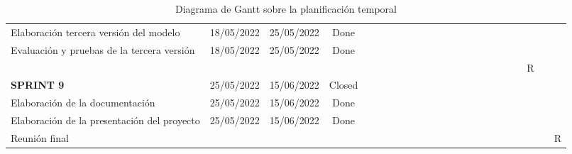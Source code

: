 \begin{landscape}
\begin{table}[h]
{\begin{tabular}{|lccc|l|l|l|l|l|l|l|l|l|l|l|l|l|l|l|l|l|l|l|}
   &
   &
   &
   &
   &
   &
   &
   &
   &
   &
   &
  \cellcolor[HTML]{07BB30} &
   &
   &
   &
   \\ \hline
\multicolumn{1}{|l|}{Elaboración tercera versión del modelo} &
  \multicolumn{1}{c|}{18/05/2022} &
  \multicolumn{1}{c|}{25/05/2022} &
  Done &
   &
   &
   &
   &
   &
   &
   &
   &
   &
   &
   &
   &
   &
   &
  \cellcolor[HTML]{07BB30} &
   &
   &
   &
   \\ \hline
\multicolumn{1}{|l|}{Evaluación y pruebas de la tercera versión} &
  \multicolumn{1}{c|}{18/05/2022} &
  \multicolumn{1}{c|}{25/05/2022} &
  Done &
   &
   &
   &
   &
   &
   &
   &
   &
   &
   &
   &
   &
   &
   &
  \cellcolor[HTML]{07BB30} &
   &
   &
   &
   \\ \hline
\multicolumn{4}{|l|}{} &
   &
   &
   &
   &
   &
   &
   &
   &
   &
   &
   &
   &
   &
   &
   &
   &
  \multicolumn{1}{c|}{\cellcolor[HTML]{FFFFC7}R} &
   &
   \\ \hline
\multicolumn{1}{|l|}{\cellcolor[HTML]{C0C0C0}\textbf{SPRINT 9}} &
  \multicolumn{1}{c|}{\cellcolor[HTML]{C0C0C0}25/05/2022} &
  \multicolumn{1}{c|}{\cellcolor[HTML]{C0C0C0}15/06/2022} &
  \cellcolor[HTML]{C0C0C0}Closed &
   &
   &
   &
   &
   &
   &
   &
   &
   &
   &
   &
   &
   &
   &
   &
  \cellcolor[HTML]{A1E8A8} &
  \cellcolor[HTML]{A1E8A8} &
  \cellcolor[HTML]{A1E8A8} &
   \\ \hline
\multicolumn{1}{|l|}{Elaboración de la documentación} &
  \multicolumn{1}{c|}{25/05/2022} &
  \multicolumn{1}{c|}{15/06/2022} &
  Done &
  \cellcolor[HTML]{A1E8A8} &
  \cellcolor[HTML]{A1E8A8} &
  \cellcolor[HTML]{A1E8A8} &
  \cellcolor[HTML]{A1E8A8} &
  \cellcolor[HTML]{A1E8A8} &
  \cellcolor[HTML]{A1E8A8} &
  \cellcolor[HTML]{A1E8A8} &
  \cellcolor[HTML]{A1E8A8} &
  \cellcolor[HTML]{A1E8A8} &
  \cellcolor[HTML]{A1E8A8} &
  \cellcolor[HTML]{A1E8A8} &
  \cellcolor[HTML]{A1E8A8} &
  \cellcolor[HTML]{A1E8A8} &
  \cellcolor[HTML]{A1E8A8} &
  \cellcolor[HTML]{A1E8A8} &
  \cellcolor[HTML]{07BB30} &
  \cellcolor[HTML]{07BB30} &
  \cellcolor[HTML]{07BB30} &
   \\ \hline
\multicolumn{1}{|l|}{Elaboración de la presentación del proyecto} &
  \multicolumn{1}{c|}{25/05/2022} &
  \multicolumn{1}{c|}{15/06/2022} &
  Done &
   &
   &
   &
   &
   &
   &
   &
   &
   &
   &
   &
   &
   &
   &
   &
  \cellcolor[HTML]{07BB30} &
  \cellcolor[HTML]{07BB30} &
  \cellcolor[HTML]{07BB30} &
   \\ \hline
\multicolumn{4}{|l|}{Reunión final} &
   &
   &
   &
   &
   &
   &
   &
   &
   &
   &
   &
   &
   &
   &
   &
   &
   &
   &
  \multicolumn{1}{c|}{\cellcolor[HTML]{FFFFC7}R} \\ \hline
\end{tabular}%
}
\caption{Diagrama de Gantt sobre la planificación temporal}
\label{tab:plani_temporal}
\end{table}


\end{landscape}




